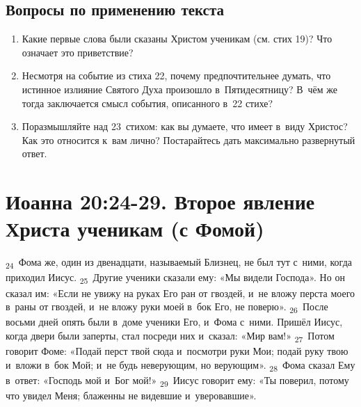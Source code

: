 \documentclass[a4paper,12pt]{article}
\begin{document}
\subsection*{Вопросы по применению текста} 
\begin{enumerate}
    \item Какие первые слова были сказаны Христом ученикам (см. стих 19)? Что означает это приветствие? 
    
    \myline
    
    \myline
    \item Несмотря на событие из стиха 22, почему предпочтительнее думать, что истинное излияние Святого Духа произошло в~Пятидесятницу? В~чём же тогда заключается смысл события, описанного в~22 стихе? 
    
    \myline
    
    \myline
    \item Поразмышляйте над 23~стихом: как вы думаете, что имеет в~виду Христос? Как это относится к~вам лично? Постарайтесь дать максимально развернутый ответ. 
    
    \myline
    
    \myline
\end{enumerate}



\section{Иоанна 20:24-29. Второе явление Христа ученикам (с Фомой)} 


\textsubscript{24}~Фома же, один из двенадцати, называемый Близнец, не был тут с~ними, когда приходил Иисус.
\textsubscript{25}~Другие ученики сказали ему: «Мы видели Господа». Но он сказал им: «Если не увижу на руках Его ран от гвоздей, и~не вложу перста моего в~раны от гвоздей, и~не вложу руки моей в~бок Его, не поверю».
\textsubscript{26}~После восьми дней опять были в~доме ученики Его, и~Фома с~ними. Пришёл Иисус, когда двери были заперты, стал посреди них и~сказал: «Мир вам!»
\textsubscript{27}~Потом говорит Фоме: «Подай перст твой сюда и~посмотри руки Мои; подай руку твою и~вложи в~бок Мой; и~не будь неверующим, но верующим».
\textsubscript{28}~Фома сказал Ему в~ответ: «Господь мой и~Бог мой!»
\textsubscript{29}~Иисус говорит ему: «Ты поверил, потому что увидел Меня; блаженны не видевшие и~уверовавшие».
\end{document}
